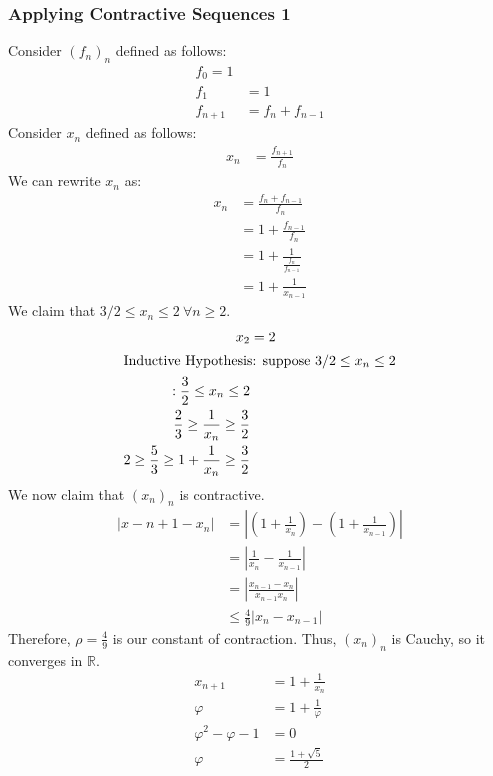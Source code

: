 \documentclass[10pt]{extarticle}
\newcommand{\R}{\mathbb{R}}
\begin{document}
    \subsubsection{Applying Contractive Sequences 1}%
    Consider $(f_n)_n$ defined as follows:
    \begin{align*}
      f_0 = 1\\
      f_1 &= 1\\
      f_{n+1} &= f_n + f_{n-1}
    \end{align*}
    Consider $x_n$ defined as follows:
    \begin{align*}
      x_n &= \frac{f_{n+1}}{f_n}
    \end{align*}
    We can rewrite $x_n$ as:
    \begin{align*}
      x_n &= \frac{f_n + f_{n-1}}{f_n}\\
          &= 1 + \frac{f_{n-1}}{f_n}\\
          &= 1 + \frac{1}{\frac{f_n}{f_{n-1}}}\\
          &= 1 + \frac{1}{x_{n-1}}
    \end{align*}
    We claim that $3/2 \leq x_n \leq 2~\forall n\geq 2$.
    \begin{align*}
      x_2 &= 2\\
      \shortintertext{Inductive Hypothesis: suppose $3/2 \leq x_n \leq 2$}:
      \frac{3}{2} \leq x_n \leq 2\\
      \frac{2}{3} \geq \frac{1}{x_n} \geq \frac{3}{2}\\
      2 \geq \frac{5}{3} \geq 1 + \frac{1}{x_n} \geq \frac{3}{2}
    \end{align*}
    We now claim that $(x_n)_n$ is contractive.
    \begin{align*}
      \left|x-{n+1}-x_n\right| &= \left|\left(1+\frac{1}{x_n}\right) - \left(1 + \frac{1}{x_{n-1}}\right)\right|\\
                               &= \left|\frac{1}{x_{n}} - \frac{1}{x_{n-1}}\right|\\
                               &= \left|\frac{x_{n-1}-x_{n}}{x_{n-1}x_{n}}\right|\\
                               &\leq \frac{4}{9} |x_{n}-x_{n-1}|
    \end{align*}
    Therefore, $\rho = \frac{4}{9}$ is our constant of contraction. Thus, $(x_n)_n$ is Cauchy, so it converges in $\R$.
    \begin{align*}
      x_{n+1} &= 1 + \frac{1}{x_{n}}\tag{$n \rightarrow \infty,~x_n \rightarrow \varphi$}\\
      \varphi &= 1 + \frac{1}{\varphi}\\
      \varphi^2 - \varphi - 1 &= 0\\
      \varphi &= \frac{1 + \sqrt{5}}{2}
    \end{align*}
\end{document}
